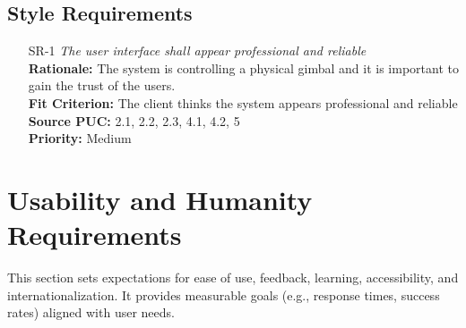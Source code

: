 \documentclass[12pt]{article}
\begin{document}
\subsection{Style Requirements}
\begin{itemize}[leftmargin=*]
  \item[SR-1] \emph{The user interface shall appear professional and reliable}\\[2mm]
        \textbf{Rationale:} The system is controlling a physical gimbal and it is important to gain the trust of the users.\\
        \textbf{Fit Criterion:} The client thinks the system appears professional and reliable\\
        \textbf{Source PUC:} 2.1, 2.2, 2.3, 4.1, 4.2, 5 \\
        \textbf{Priority:} Medium
\end{itemize}

\section{Usability and Humanity Requirements}
This section sets expectations for ease of use, feedback, learning,
accessibility, and internationalization. It provides measurable goals (e.g.,
response times, success rates) aligned with user needs.
\end{document}

